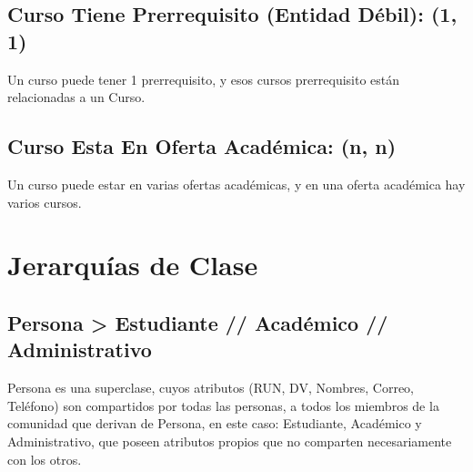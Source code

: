 \documentclass[12pt]{article}
\begin{document}
\subsection*{Curso Tiene Prerrequisito (Entidad Débil): (1, 1)}
Un curso puede tener 1 prerrequisito, y esos cursos prerrequisito están relacionadas a un Curso.  
\subsection*{Curso Esta En Oferta Académica: (n, n)}
Un curso puede estar en varias ofertas académicas, y en una oferta académica hay varios cursos.
\section*{Jerarquías de Clase}
\subsection*{Persona \textgreater \; Estudiante // Académico // Administrativo}
Persona es una superclase, cuyos atributos (RUN, DV, Nombres, Correo, Teléfono) son compartidos por todas las personas, a todos los miembros de la comunidad que derivan de Persona, en este caso: Estudiante, Académico y Administrativo, que poseen atributos propios que no comparten necesariamente con los otros. 
\end{document}
